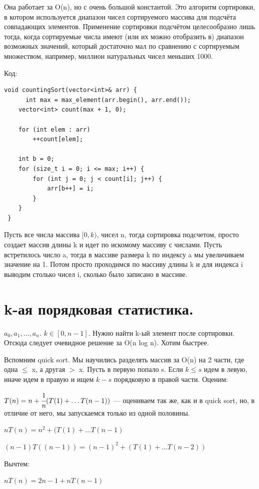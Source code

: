 \documentclass{article}
\begin{document}
 Она работает за O(n), но с очень большой константой. Это алгоритм сортировки, в котором используется диапазон чисел сортируемого массива для подсчёта совпадающих элементов. Применение сортировки подсчётом целесообразно лишь тогда, когда сортируемые числа имеют (или их можно отобразить в) диапазон возможных значений, который достаточно мал по сравнению с сортируемым множеством, например, миллион натуральных чисел меньших 1000.
 
Код:
\begin{lstlisting}[mathescape]
void countingSort(vector<int>& arr) {
      int max = max_element(arr.begin(), arr.end());
 	vector<int> count(max + 1, 0);

 	for (int elem : arr)
 		++count[elem];
	
 	int b = 0;
 	for (size_t i = 0; i <= max; i++) {
 		for (int j = 0; j < count[i]; j++) {
 			arr[b++] = i;
 		}
 	}	
 }
 \end{lstlisting}

 Пусть все числа массива $[0,k)$, чисел n, тогда сортировка подсчетом, просто создает массив длины k и идет по искомому массиву с числами. Пусть встретилось число a, тогда в массиве размера k по индексу a мы увеличиваем значение на 1. Потом просто проходимся по массиву длины k и для индекса i выводим столько чисел i, сколько было записано в массиве.

\pagebreak

 \section{k-ая порядковая статистика.}

$a_0,a_1,\ldots,a_n$. $k \in [0,n-1]$. Нужно найти k-ый элемент после сортировки. Отсюда следует очевидное решение за O(n log n). Хотим быстрее.

Вспомним quick sort. Мы научились разделять массив за O(n) на 2 части, где одна $\leq$ x, а другая $>$ x. Пусть в первую попало s. Если $k\leq s$ идем в левую, иначе идем в правую и ищем $k-s$ порядковую в правой части.  Оценим:

$T(n)=n + \cfrac{1}{n} (T(1)+\ldots T(n-1))$ --- оцениваем так же, как и в quick sort, но, в отличие от него, мы запускаемся только из одной половины.

$nT(n)=n^2 +(T(1)+\ldots T(n-1)$

$(n-1)T((n-1))=(n-1)^2 +(T(1)+\ldots T(n-2))$

Вычтем:

$nT(n) = 2n-1 + n T(n-1)$
\end{document}
